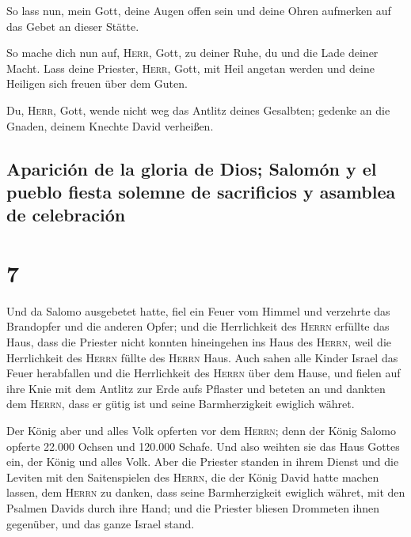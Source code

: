  So lass nun, mein Gott, deine Augen offen sein und deine
Ohren aufmerken auf das Gebet an dieser Stätte.

 So mache dich nun auf, \textsc{Herr}, Gott, zu deiner
Ruhe, du und die Lade deiner Macht. Lass deine Priester, \textsc{Herr},
Gott, mit Heil angetan werden und deine Heiligen sich freuen über dem
Guten.

 Du, \textsc{Herr}, Gott, wende nicht weg das Antlitz
deines Gesalbten; gedenke an die Gnaden, deinem Knechte David verheißen.

\hypertarget{apariciuxf3n-de-la-gloria-de-dios-salomuxf3n-y-el-pueblo-fiesta-solemne-de-sacrificios-y-asamblea-de-celebraciuxf3n}{%
\subsection{Aparición de la gloria de Dios; Salomón y el pueblo fiesta
solemne de sacrificios y asamblea de
celebración}\label{apariciuxf3n-de-la-gloria-de-dios-salomuxf3n-y-el-pueblo-fiesta-solemne-de-sacrificios-y-asamblea-de-celebraciuxf3n}}

\hypertarget{section-6}{%
\section{7}\label{section-6}}

 Und da Salomo ausgebetet hatte, fiel ein Feuer vom Himmel
und verzehrte das Brandopfer und die anderen Opfer; und die Herrlichkeit
des \textsc{Herrn} erfüllte das Haus,  dass die Priester
nicht konnten hineingehen ins Haus des \textsc{Herrn}, weil die
Herrlichkeit des \textsc{Herrn} füllte des \textsc{Herrn} Haus.
 Auch sahen alle Kinder Israel das Feuer herabfallen und
die Herrlichkeit des \textsc{Herrn} über dem Hause, und fielen auf ihre
Knie mit dem Antlitz zur Erde aufs Pflaster und beteten an und dankten
dem \textsc{Herrn}, dass er gütig ist und seine Barmherzigkeit ewiglich
währet.

 Der König aber und alles Volk opferten vor dem
\textsc{Herrn};  denn der König Salomo opferte 22.000
Ochsen und 120.000 Schafe. Und also weihten sie das Haus Gottes ein, der
König und alles Volk.  Aber die Priester standen in ihrem
Dienst und die Leviten mit den Saitenspielen des \textsc{Herrn}, die der
König David hatte machen lassen, dem \textsc{Herrn} zu danken, dass
seine Barmherzigkeit ewiglich währet, mit den Psalmen Davids durch ihre
Hand; und die Priester bliesen Drommeten ihnen gegenüber, und das ganze
Israel stand.

